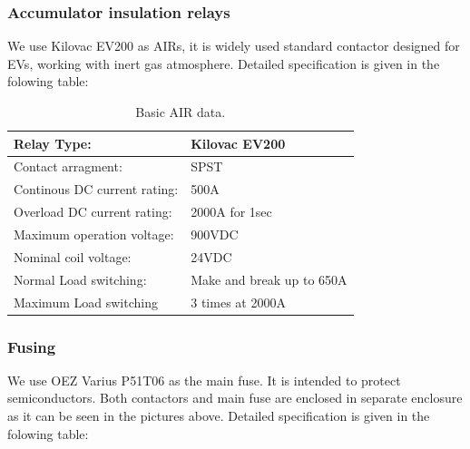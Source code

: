 \subsubsection{Accumulator insulation relays}

We use Kilovac EV200 as AIRs, it is widely used standard contactor designed for EVs, working with inert gas atmosphere. Detailed specification is given in the folowing table:

\begin{table}[H]
	\centering
	\caption{Basic AIR data.}
	\begin{tabularx}{\textwidth}{|X|X|}
		\hline
		Relay Type: & Kilovac EV200 \\[\TableSize]
		\hline
		Contact arragment: & SPST \\[\TableSize]
		\hline
		Continous DC current rating: & 500A \\[\TableSize]
		\hline
		Overload DC current rating:  & 2000A for 1sec \\[\TableSize]
		\hline
		Maximum operation voltage: & 900VDC \\[\TableSize]
		\hline
		Nominal coil voltage: & 24VDC \\[\TableSize]
		\hline
		Normal Load switching: & Make and break up to 650A \\[\TableSize]
		\hline
		Maximum Load switching & 3 times at 2000A \\[\TableSize]
		\hline
	\end{tabularx}%
	\label{tab:acc-air}%
\end{table}%

\subsubsection{Fusing}

We use OEZ Varius P51T06 as the main fuse. It is intended to protect semiconductors. Both contactors and main fuse are enclosed in separate enclosure as it can be seen in the pictures above. Detailed specification is given in the folowing table:

